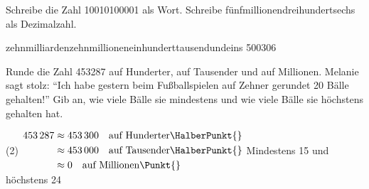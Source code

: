 
\begin{Aufgabe}{3}
	\begin{tasks}
		\task Schreibe die Zahl \num{10010100001} als Wort.
		\task Schreibe fünfmillionendreihundertsechs als Dezimalzahl.
	\end{tasks}
\end{Aufgabe}
\begin{Loesung}
	\begin{tasks}
		\task zehnmilliardenzehnmillioneneinhunderttausendundeins \Punkt{}
		\task \num{500306} \Punkt
	\end{tasks}
\end{Loesung}
\begin{Aufgabe}{3}
	\begin{tasks}
		\task Runde die Zahl \num{453287}{} auf Hunderter, auf Tausender und auf Millionen.
		\task Melanie sagt stolz: "`Ich habe gestern beim Fußballspielen auf Zehner gerundet 20 Bälle gehalten!"'
		Gib an, wie viele Bälle sie mindestens und wie viele Bälle sie höchstens gehalten hat.
	\end{tasks}
\end{Aufgabe}
\begin{Loesung}
	\begin{tasks}(2)
		\task $
		\begin{aligned}
			\num{453287}
			&\approx \num{453300}\quad\text{auf Hunderter}\HalberPunkt{}\\
			&\approx \num{453000}\quad\text{auf Tausender}\HalberPunkt{}\\
			&\approx \num{0}\quad\text{auf Millionen}\Punkt{}\\
		\end{aligned}
		$
		\task Mindestens 15 \HalberPunkt{} und höchstens 24 \HalberPunkt{}
	\end{tasks}
\end{Loesung}

